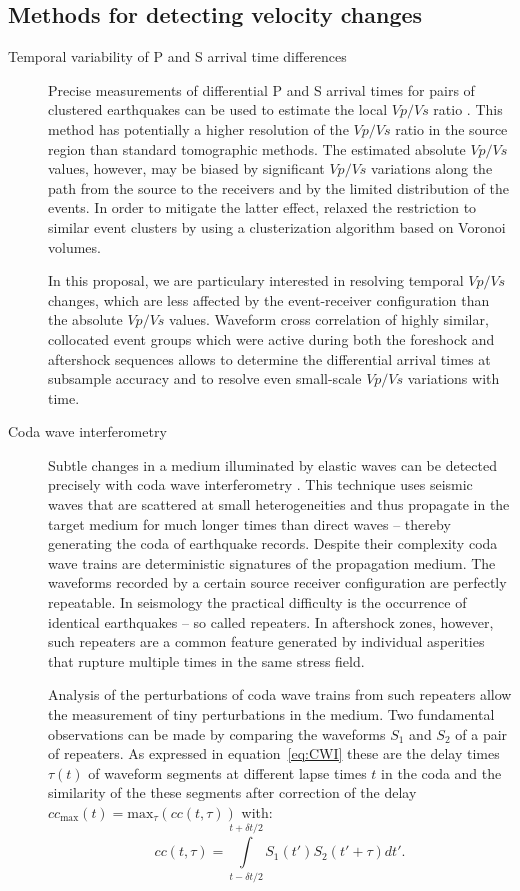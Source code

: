 \documentclass[11pt]{article}
\begin{document}
\subsection*{Methods for detecting velocity changes}

\begin{description}
\item[Temporal variability of P and S arrival time differences]
	Precise measurements of differential P and S arrival times for pairs of clustered earthquakes can be used to estimate the local $Vp/Vs$ ratio \citep{Lin2007}. This method has potentially a higher resolution of the $Vp/Vs$ ratio in the source region than standard tomographic methods. The estimated absolute $Vp/Vs$ values, however, may be biased by significant $Vp/Vs$ variations along the path from the source to the receivers and by the limited distribution of the events.
In order to mitigate the latter effect, \cite{bloch:2014a} relaxed the restriction to similar event clusters by using a clusterization algorithm based on Voronoi volumes.

In this proposal, we are particulary interested in resolving temporal $Vp/Vs$ changes, which are less affected by the event-receiver configuration than the absolute $Vp/Vs$ values. Waveform cross correlation of highly similar, collocated event groups which were active during both the foreshock and aftershock sequences allows to determine the differential arrival times at subsample accuracy and to resolve even small-scale $Vp/Vs$ variations with time.

\item[Coda wave interferometry]
Subtle changes in a medium illuminated by elastic waves can be detected precisely with coda wave interferometry \citep[CWI, ][]{poupinet_etal_JGR_84,Snieder2002,Snieder2006}. This technique uses seismic waves that are scattered at small heterogeneities and thus propagate in the target medium for much longer times than direct waves -- thereby generating the coda of earthquake records. Despite their complexity coda wave trains are deterministic signatures of the propagation medium. The waveforms recorded by a certain source receiver configuration are perfectly repeatable. In seismology the practical difficulty is the occurrence of identical earthquakes -- so called repeaters. In aftershock zones, however, such repeaters are a common feature \citep{yu13_repeating} generated by individual asperities that rupture multiple times in the same stress field. 

Analysis of the perturbations of coda wave trains from such repeaters allow the measurement of tiny perturbations in the medium. Two fundamental observations can be made by comparing the waveforms $S_1$ and $S_2$ of a pair of repeaters. As expressed in equation~\ref{eq:CWI} these are the delay times $\tau(t)$ of waveform segments at different lapse times $t$ in the coda and the similarity of the these segments after correction of the delay $cc_{\mbox{max}}(t) = \mbox{max}_\tau(cc(t,\tau))$ with:
\begin{equation}
cc(t,\tau) = \int\limits_{t-\delta t/2}^{t+\delta t/2}S_1(t')S_2(t'+\tau) dt'.
\label{eq:CWI}
\end{equation} 


\end{description}
\end{document}
